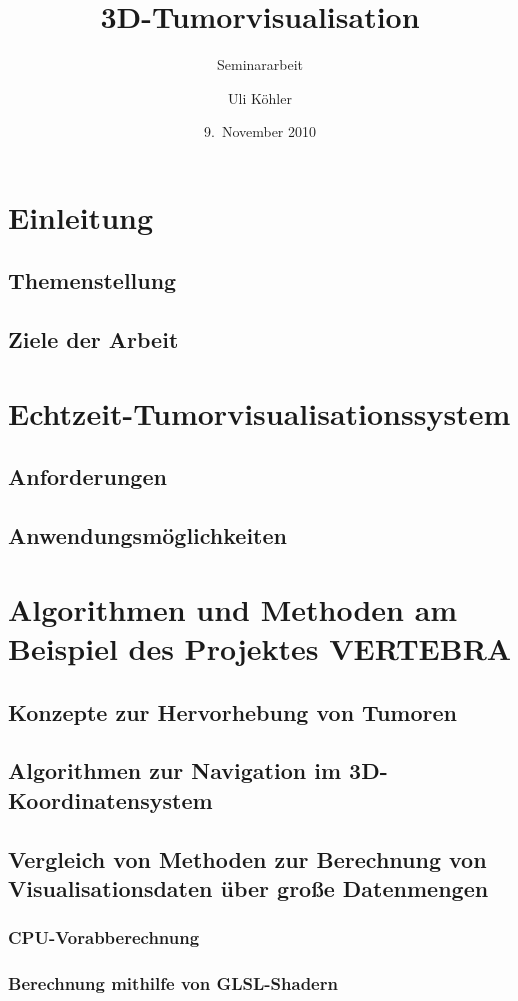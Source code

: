 \documentclass[a4paper]{scrartcl}
\title{3D-Tumorvisualisation}
\subtitle{Seminararbeit}
\author{Uli Köhler}
\date{9.~November 2010}
\begin{document}
\tableofcontents
\section{Einleitung}
\subsection{Themenstellung}
\subsection{Ziele der Arbeit}
\section{Echtzeit-Tumorvisualisationssystem}
\subsection{Anforderungen}
\subsection{Anwendungsmöglichkeiten}
\section{Algorithmen und Methoden am Beispiel des Projektes VERTEBRA}
\subsection{Konzepte zur Hervorhebung von Tumoren}
\subsection{Algorithmen zur Navigation im 3D-Koordinatensystem}
\subsection{Vergleich von Methoden zur Berechnung von Visualisationsdaten über große Datenmengen}
\subsubsection{CPU-Vorabberechnung}
\subsubsection{Berechnung mithilfe von GLSL-Shadern}
\subsubsection{}
\end{document}
